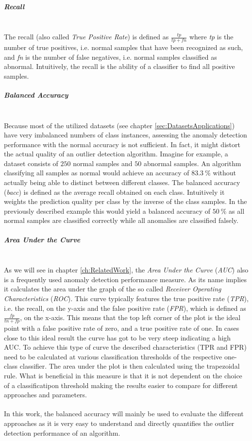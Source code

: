 \subparagraph{Recall}\mbox{}\\
The recall (also called \textit{True Positive Rate}) is defined as $\frac{tp}{tp+fn}$ where \textit{tp} is the number of true positives, i.e. normal samples that have been recognized as such, and \textit{fn} is the number of false negatives, i.e. normal samples classified as abnormal. Intuitively, the recall is the ability of a classifier to find all positive samples.


\subparagraph{Balanced Accuracy}\mbox{}\\
Because most of the utilized datasets (see chapter \ref{sec:DatasetsApplications}) have very imbalanced numbers of class instances, assessing the anomaly detection performance with the normal accuracy is not sufficient. In fact, it might distort the actual quality of an outlier detection algorithm. Imagine for example, a dataset consists of $250$ normal samples and $50$ abnormal samples. An algorithm classifying all samples as normal would achieve an accuracy of $83.3\:\%$ without actually being able to distinct between different classes. The balanced accuracy (\textit{bacc}) is defined as the average recall obtained on each class. Intuitively it weights the prediction quality per class by the inverse of the class samples. In the previously described example this would yield a balanced accuracy of $50\:\%$ as all normal samples are classified correctly while all anomalies are classified falsely.

\subparagraph{Area Under the Curve}\mbox{}\\
As we will see in chapter \ref{ch:RelatedWork}, the \textit{Area Under the Curve} (\textit{AUC})\cite{https://towardsdatascience.com/understanding-auc-roc-curve-68b2303cc9c5} also is a frequently used anomaly detection performance measure. As its name implies it calculates the area under the graph of the so called \textit{Receiver Operating Characteristics} (\textit{ROC}). This curve typically features the true positive rate (\textit{TPR}), i.e. the recall, on the y-axis and the false positive rate (\textit{FPR}), which is defined as $\frac{fp}{tn+fp}$,  on the x-axis. This means that the top left corner of the plot is the ideal point with a false positive rate of zero, and a true positive rate of one. In cases close to this ideal result the curve has got to be very steep indicating a high AUC. To achieve this type of curve the described characteristics (TPR and FPR) need to be calculated at various classification thresholds of the respective one-class classifier. The area under the plot is then calculated using the trapezoidal rule. What is beneficial in this measure is that it is not dependent on the choice of a classificatipon threshold making the results easier to compare for different approaches and parameters. \cite{https://towardsdatascience.com/understanding-auc-roc-curve-68b2303cc9c5}\\
\\
In this work, the balanced accuracy will mainly be used to evaluate the different approaches as it is very easy to understand and directly quantifies the outlier detection performance of an algorithm. 

